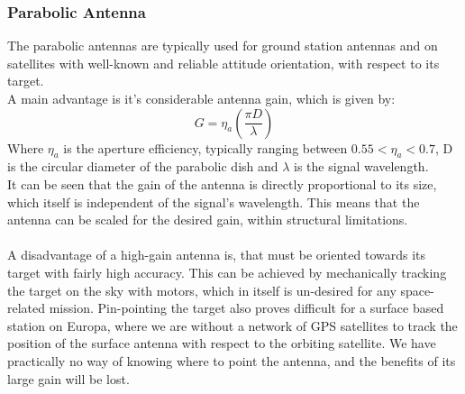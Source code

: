 \subsubsection{Parabolic Antenna}
The parabolic antennas are typically used for ground station antennas and on satellites with well-known and reliable attitude orientation, with respect to its target.\\
A main advantage is it's considerable antenna gain, which is given by:
\begin{equation}
G = \eta_a\left(\frac{\pi D}{\lambda}\right)
\end{equation}  
Where $\eta_a$ is the aperture efficiency, typically ranging between $0.55<\eta_a<0.7$, D is the circular diameter of the parabolic dish and $\lambda$ is the signal wavelength.\\
It can be seen that the gain of the antenna is directly proportional to its size, which itself is independent of the signal's wavelength. This means that the antenna can be scaled for the desired gain, within structural limitations.\\
\\
A disadvantage of a high-gain antenna is, that must be oriented towards its target with fairly high accuracy. This can be achieved by mechanically tracking the target on the sky with motors, which in itself is un-desired for any space-related mission. Pin-pointing the target also proves difficult for a surface based station on Europa, where we are without a network of GPS satellites to track the position of the surface antenna with respect to the orbiting satellite. We have practically no way of knowing where to point the antenna, and the benefits of its large gain will be lost. 
